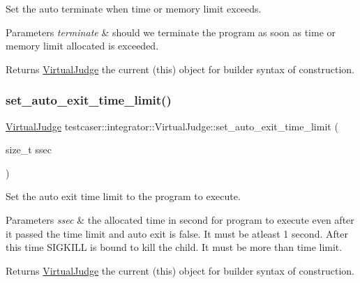 Set the auto terminate when time or memory limit exceeds. 


\begin{DoxyParams}{Parameters}
{\em terminate} & should we terminate the program as soon as time or memory limit allocated is exceeded. \\
\hline
\end{DoxyParams}
\begin{DoxyReturn}{Returns}
\hyperlink{classtestcaser_1_1integrator_1_1VirtualJudge}{Virtual\+Judge} the current (this) object for builder syntax of construction. 
\end{DoxyReturn}
\mbox{\label{classtestcaser_1_1integrator_1_1VirtualJudge_ac739270769d85fd09ae35aa53726f8f4}} 
\subsubsection{\texorpdfstring{set\+\_\+auto\+\_\+exit\+\_\+time\+\_\+limit()}{set\_auto\_exit\_time\_limit()}}
{\footnotesize\ttfamily \hyperlink{classtestcaser_1_1integrator_1_1VirtualJudge}{Virtual\+Judge} testcaser\+::integrator\+::\+Virtual\+Judge\+::set\+\_\+auto\+\_\+exit\+\_\+time\+\_\+limit (\begin{DoxyParamCaption}\item[{size\+\_\+t}]{ssec }\end{DoxyParamCaption})\hspace{0.3cm}{\ttfamily [inline]}}



Set the auto exit time limit to the program to execute. 


\begin{DoxyParams}{Parameters}
{\em ssec} & the allocated time in second for program to execute even after it passed the time limit and auto exit is false. It must be atleast 1 second. After this time S\+I\+G\+K\+I\+LL is bound to kill the child. It must be more than time limit. \\
\hline
\end{DoxyParams}
\begin{DoxyReturn}{Returns}
\hyperlink{classtestcaser_1_1integrator_1_1VirtualJudge}{Virtual\+Judge} the current (this) object for builder syntax of construction. 
\end{DoxyReturn}
\mbox{\label{classtestcaser_1_1integrator_1_1VirtualJudge_ae9fc3d7bf1bf75fc1ec695fe831d16b6}} 
